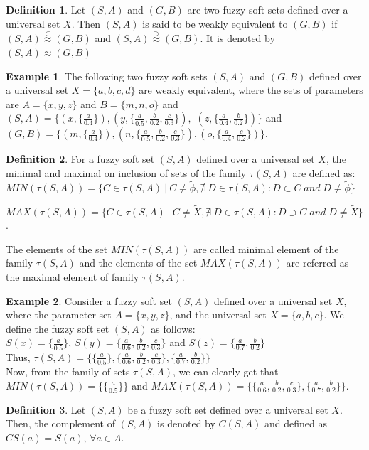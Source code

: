 \documentclass{article}
\theoremstyle{definition}
\newtheorem{definition}{Definition}[section]
\newtheorem{example}{Example}[section]
\begin{document}
\begin{definition}

    Let $(S, A)$ and $(G, B)$ are two fuzzy soft sets defined over a universal set $X$. Then $(S, A)$ is said to be weakly equivalent to $(G, B)$ if $(S,A)\stackrel{\subset}{\approx}(G,B)$ and $(S,A)\stackrel{\supset}{\approx}(G,B)$. It is denoted by $(S,A)\approx (G,B)$ 
\end{definition}

\begin{example}
    The following two fuzzy soft sets $(S,A)$ and $(G,B)$ defined over a universal set $X=\{a, b, c, d\}$ are weakly equivalent, where the sets of parameters are $A=\{x, y, z\}$ and $B=\{m, n, o\}$ and $(S,A)=\{(x, \{\frac{a}{0.4}\}), (y, \{\frac{a}{0.5}, \frac{b}{0.2}, \frac{c}{0.3}\}), $ $(z, \{\frac{a}{0.4}, \frac{b}{0.2}\})\}$ and $(G,B)=\{(m, \{\frac{a}{0.4}\}), (n, \{\frac{a}{0.5}, \frac{b}{0.2}, \frac{c}{0.3}\}), (o, \{\frac{a}{0.4}, \frac{c}{0.2}\})\}$.
\end{example}
\begin{definition}
    For a fuzzy soft set $(S, A)$ defined over a universal set $X$, the minimal and maximal on inclusion of sets of the family $\tau(S,A)$ are defined as:\\

$MIN(\tau(S,A))=\{C\in \tau(S,A)~|~C\neq \tilde{\phi}, \nexists~  D \in \tau(S,A) : D\subset C \;and\; D \neq \tilde{\phi} \}$


$MAX(\tau(S,A))=\{C\in \tau(S,A)~|~C\neq \tilde{X}, \nexists~  D \in \tau(S,A) : D\supset C \;and\; D \neq \tilde{X} \}$.


The elements of the set $MIN(\tau(S,A))$ are called minimal element of the family $\tau(S,A)$ and the elements of the set $MAX(\tau(S,A))$ are referred as the maximal element of family $\tau(S,A)$.
\end{definition}

\begin{example}
    Consider a fuzzy soft set $(S, A)$ defined over a universal set $X$, where the parameter set $A=\{x, y, z\}$, and the universal set $X=\{a, b, c\}$.  We define the fuzzy soft set $(S,A)$ as follows:\\

    
    $S(x)=\{\frac{a}{0.5}\}$, $S(y)=\{\frac{a}{0.6}, \frac{b}{0.2}, \frac{c}{0.3}\}$ and $S(z)=\{\frac{a}{0.7}, \frac{b}{0.2}\}$ \\

    Thus, $\tau(S, A)=\{\{\frac{a}{0.5}\}, \{\frac{a}{0.6}, \frac{b}{0.2}, \frac{c}{0.3}\}, \{\frac{a}{0.7}, \frac{b}{0.2}\}\}$\\

    Now, from the family of sets $\tau(S, A)$, we can clearly get that 
    $MIN(\tau(S,A))=\{\{\frac{a}{0.5}\}\}$ and $MAX(\tau(S,A))=\{\{\frac{a}{0.6}, \frac{b}{0.2}, \frac{c}{0.3}\}, \{\frac{a}{0.7}, \frac{b}{0.2}\}\}$. 
\end{example}
\begin{definition}
    Let $(S, A)$ be a fuzzy soft set defined over a universal set $X$. Then, the complement of $(S, A)$ is denoted by $C(S, A)$ and defined as $CS(a)= \overline {S(a)}$, $\forall a\in A$.
\end{definition}
\end{document}
